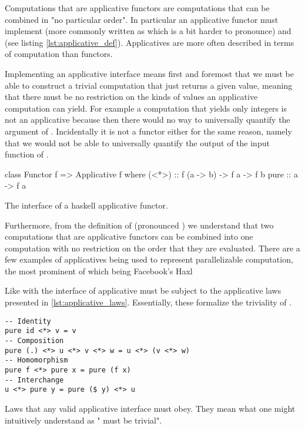   Computations that are applicative functors
  \cite{mcbrideApplicativeProgrammingEffects2008} are
  computations that can be combined in "no particular order". In
  particular an applicative functor must implement  (more commonly written as \hask{<*>} which is a bit
  harder to pronounce) and  (see listing
  \ref{lst:applicative_def}). Applicatives are more often described in
  terms of computation than functors.

  Implementing an applicative interface means first and foremost that we must
  be able to construct a trivial computation that just returns a given
  value, meaning that there must be no restriction on the kinds of
  values an applicative computation can yield. For example a computation
  that yields only integers is not an applicative because then there
  would no way to universally quantify the argument of
  . Incidentally it is not a functor either for the same
  reason, namely that we would not be able to universally quantify the
  output of the input function of .

  \begin{code}
\begin{haskellcode}
class Functor f => Applicative f  where
  (<*>) :: f (a -> b) -> f a -> f b
  pure :: a -> f a
\end{haskellcode}
    \caption{\label{lst:applicative_def}The interface of a haskell applicative functor.}
  \end{code}

  Furthermore, from the definition of \hask{<*>} (pronounced ) we
  understand that two computations that are applicative functors can be
  combined into one computation with no restriction on the order that
  they are evaluated. There are a few examples of applicatives being
  used to represent parallelizable computation, the most prominent of
  which being Facebook's Haxl \cite{marlowHaxlProjectFacebook2013}

  Like with  the interface of applicative must be subject
  to the applicative laws presented in
  \ref{lst:applicative_laws}. Essentially, these formalize the triviality
  of .

  \begin{code}
\begin{verbatim}
-- Identity
pure id <*> v = v
-- Composition
pure (.) <*> u <*> v <*> w = u <*> (v <*> w)
-- Homomorphism
pure f <*> pure x = pure (f x)
-- Interchange
u <*> pure y = pure ($ y) <*> u
\end{verbatim}
    \caption{\label{lst:applicative_laws}Laws that any valid applicative
      interface must obey. They mean what one might intuitively understand as
      " must be trivial".}
  \end{code}

